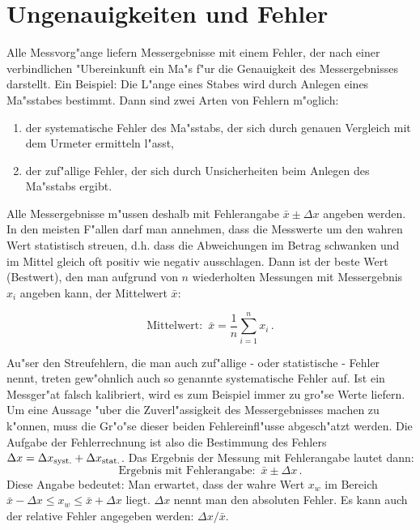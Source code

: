 \section{Ungenauigkeiten und Fehler}

Alle Messvorg"ange liefern Messergebnisse mit einem Fehler, der
nach einer verbindlichen "Ubereinkunft ein Ma"s f"ur die Genauigkeit
des Messergebnisses darstellt. Ein Beispiel: Die L"ange eines
Stabes wird durch Anlegen eines Ma"sstabes bestimmt. Dann sind zwei
Arten von Fehlern m"oglich:
%
\begin{enumerate}
  \item der systematische Fehler des Ma"sstabs, der sich durch genauen Vergleich
   mit dem Urmeter ermitteln l"asst,
  \item der zuf"allige Fehler, der sich durch Unsicherheiten beim Anlegen des
 Ma"sstabs ergibt.
\end{enumerate}

Alle Messergebnisse m"ussen deshalb mit Fehlerangabe $\bar{x} \pm
\Delta x$ angeben werden. In den meisten
F"allen darf man annehmen, dass die Messwerte um den wahren Wert
statistisch streuen, d.h. dass die Abweichungen im Betrag
schwanken und im Mittel gleich oft positiv wie negativ
ausschlagen. Dann ist der beste Wert (Bestwert),
den man aufgrund von $n$ wiederholten Messungen mit Messergebnis
$x_i$ angeben kann, der Mittelwert $\bar{x}$:
%
\begin{important}
\begin{equation}\label{e:mw}
\mbox{Mittelwert: } \,  \bar{x} = \frac{1}{n} \sum_{i=1}^n x_i \,
.
\end{equation}
\end{important}
%
Au"ser den Streufehlern, die man auch zuf"allige - oder statistische
- Fehler nennt, treten gew"ohnlich auch so genannte systematische
Fehler auf. Ist ein Messger"at falsch kalibriert, wird es zum
Beispiel immer zu gro"se Werte liefern. Um eine Aussage "uber die
Zuverl"assigkeit des Messergebnisses machen zu k"onnen, muss die
Gr"o"se dieser beiden Fehlereinfl"usse abgesch"atzt werden. Die
Aufgabe der Fehlerrechnung ist also die Bestimmung des Fehlers
$\Delta x = \Delta x_{\rm syst.} + \Delta x_{\rm stat.}$. Das Ergebnis der
Messung mit Fehlerangabe lautet dann:
%
\begin{equation}\label{e:ergfehler}
  \mbox{Ergebnis mit Fehlerangabe: } \,  \bar{x} \pm \Delta x \, .
\end{equation}
%
Diese Angabe bedeutet: Man erwartet, dass der wahre Wert $x_w$ im
Bereich $\bar{x} - \Delta x \leq x_w \leq \bar{x} + \Delta x $
liegt. $\Delta x$ nennt man den absoluten Fehler. Es kann auch der
relative Fehler angegeben werden: $\Delta x / \bar{x}$.

